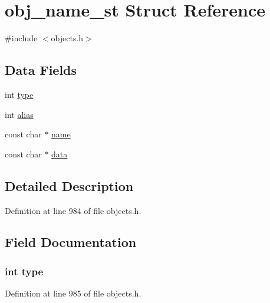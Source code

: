 \hypertarget{structobj__name__st}{}\section{obj\+\_\+name\+\_\+st Struct Reference}
\label{structobj__name__st}


{\ttfamily \#include $<$objects.\+h$>$}

\subsection*{Data Fields}
\begin{DoxyCompactItemize}
\item 
int \hyperlink{structobj__name__st_ac765329451135abec74c45e1897abf26}{type}
\item 
int \hyperlink{structobj__name__st_a56f0b708d0bd5a42481fa2dc83a750d3}{alias}
\item 
const char $\ast$ \hyperlink{structobj__name__st_afcd1706c9144e6d6eee6127661ae3be2}{name}
\item 
const char $\ast$ \hyperlink{structobj__name__st_ae4950db1dbfff8459a712737063b61aa}{data}
\end{DoxyCompactItemize}


\subsection{Detailed Description}


Definition at line 984 of file objects.\+h.



\subsection{Field Documentation}
\subsubsection[{\texorpdfstring{type}{type}}]{\setlength{\rightskip}{0pt plus 5cm}int type}\hypertarget{structobj__name__st_ac765329451135abec74c45e1897abf26}{}\label{structobj__name__st_ac765329451135abec74c45e1897abf26}


Definition at line 985 of file objects.\+h.

